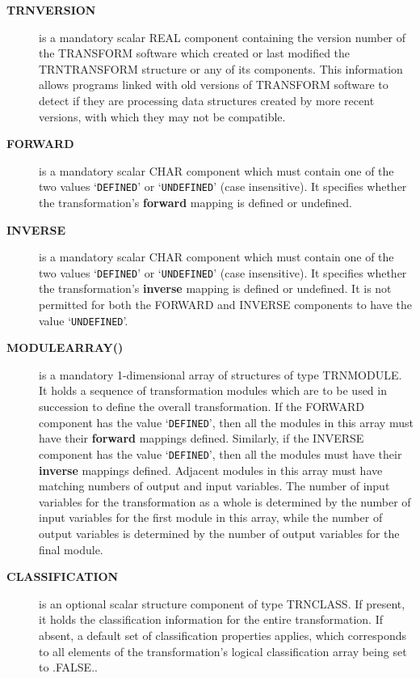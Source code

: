 \documentclass[twoside,11pt]{article}
\renewcommand{\_}{\texttt{\symbol{95}}}
\newcommand{\name}[1]{\mbox{\small{#1}}}
\begin{document}
\begin{description}

\item[\textbf{\name{TRN\_VERSION}}] is a mandatory scalar \name{\_REAL} component
containing the version number of the \name{TRANSFORM} software which created
or last modified the \name{TRN\_TRANSFORM} structure or any of its
components.
This information allows programs linked with old versions of
\name{TRANSFORM} software to detect if they are processing data structures
created by more recent versions, with which they may not be compatible.

\item[\textbf{\name{FORWARD}}] is a mandatory scalar \name{\_CHAR} component which
must contain one of the two values `\verb#DEFINED#' or `\verb#UNDEFINED#' (case
insensitive).
It specifies whether the transformation's \textbf{forward} mapping is defined
or undefined.

\item[\textbf{\name{INVERSE}}] is a mandatory scalar \name{\_CHAR} component which
must contain one of the two values `\verb#DEFINED#' or `\verb#UNDEFINED#' (case
insensitive).
It specifies whether the transformation's \textbf{inverse} mapping is defined
or undefined.
It is not permitted for both the \name{FORWARD} and \name{INVERSE}
components to have the value `\verb#UNDEFINED#'.

\item[\textbf{\name{MODULE\_ARRAY()}}] is a mandatory 1-dimensional array of
structures of type \name{TRN\_MODULE}.
It holds a sequence of transformation modules which are to be used in
succession to define the overall transformation.
If the \name{FORWARD} component has the value `\verb#DEFINED#', then all the
modules in this array must have their \textbf{forward} mappings defined.
Similarly, if the \name{INVERSE} component has the value `\verb#DEFINED#', then
all the modules must have their \textbf{inverse} mappings defined.
Adjacent modules in this array must have matching numbers of output and input
variables.
The number of input variables for the transformation as a whole is
determined by the number of input variables for the first module in this
array, while the number of output variables is determined by the number of
output variables for the final module.

\item[\textbf{\name{CLASSIFICATION}}] is an optional scalar structure component
of type \name{TRN\_CLASS}.  If present, it holds the classification
information for the entire transformation.  If absent, a default set of
classification properties applies, which corresponds to all elements of the
transformation's logical classification array being set to \name{.FALSE.}.

\end{description}
\end{document}
